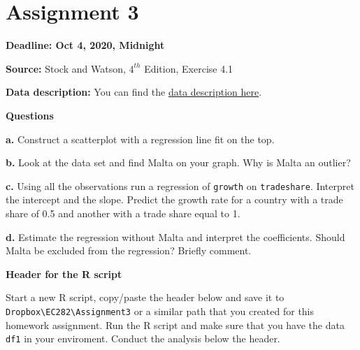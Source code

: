 \documentclass[
]{book}
\begin{document}
\hypertarget{assignment-3}{%
\section{Assignment 3}\label{assignment-3}}

\textbf{Deadline: Oct 4, 2020, Midnight}

\textbf{Source:} Stock and Watson, \(4^{th}\) Edition, Exercise 4.1

\textbf{Data description:} You can find the \href{https://www.dropbox.com/s/3e24u6eymvmhldd/Growth_Description.pdf?dl=1}{data description here}.

\textbf{Questions}

\textbf{a.} Construct a scatterplot with a regression line fit on the top.

\textbf{b.} Look at the data set and find Malta on your graph. Why is Malta an outlier?

\textbf{c.} Using all the observations run a regression of \texttt{growth} on \texttt{tradeshare}. Interpret the intercept and the slope. Predict the growth rate for a country with a trade share of 0.5 and another with a trade share equal to 1.

\textbf{d.} Estimate the regression without Malta and interpret the coefficients. Should Malta be excluded from the regression? Briefly comment.

\textbf{Header for the R script}

Start a new R script, copy/paste the header below and save it to \texttt{Dropbox\textbackslash{}EC282\textbackslash{}Assignment3} or a similar path that you created for this homework assignment. Run the R script and make sure that you have the data \texttt{df1} in your enviroment. Conduct the analysis below the header.
\end{document}
